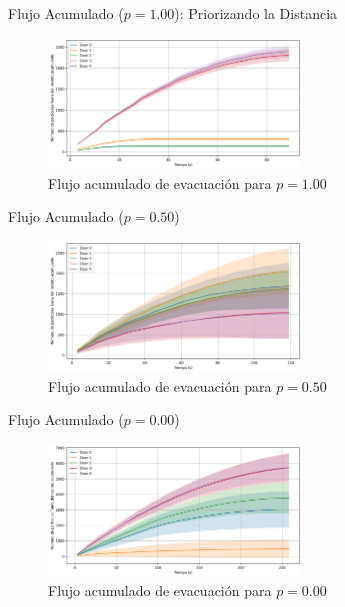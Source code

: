 \documentclass[aspectratio=169]{beamer}
\begin{document}
\begin{frame}{Flujo Acumulado ($p=1.00$): Priorizando la Distancia}
    \begin{figure}
        \centering
        \includegraphics[width=0.6\textwidth]{img/cumulative_door_flows_t_20_&_p_1.00.png}
        \caption{Flujo acumulado de evacuación para $p=1.00$}
    \end{figure}
\end{frame}

\begin{frame}{Flujo Acumulado ($p=0.50$)}
    \begin{figure}
        \centering
        \includegraphics[width=0.6\textwidth]{img/cumulative_door_flows_t_20_&_p_0.50.png}
        \caption{Flujo acumulado de evacuación para $p=0.50$}
    \end{figure}
\end{frame}

\begin{frame}{Flujo Acumulado ($p=0.00$)}
    \begin{figure}
        \centering
        \includegraphics[width=0.6\textwidth]{img/cumulative_door_flows_t_20_&_p_0.00.png}
        \caption{Flujo acumulado de evacuación para $p=0.00$}
    \end{figure}
\end{frame}
\end{document}

